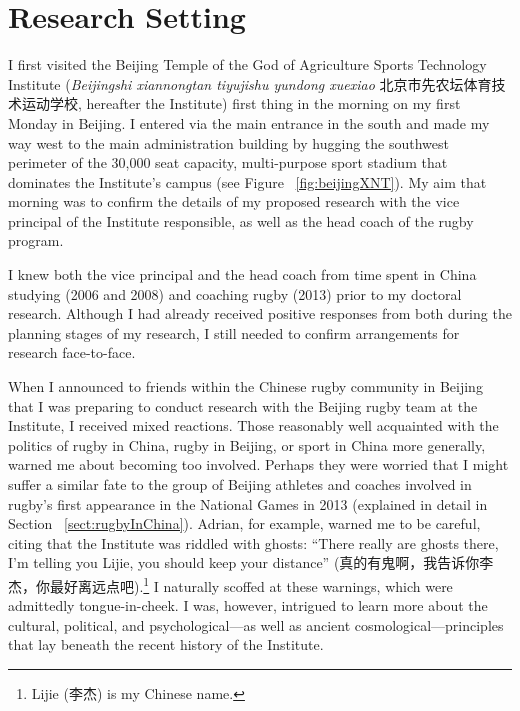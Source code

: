 
\begin{savequote}[8cm]

  \qauthor{}
\end{savequote}


\chapter{\label{chap:researchSetting}Research Setting}


\minitoc




                                          \begin{CJK}{UTF8}{gbsn}


I first visited the Beijing Temple of the God of Agriculture Sports Technology Institute (\textit{Beijingshi xiannongtan tiyujishu yundong xuexiao} 北京市先农坛体育技术运动学校,
hereafter the Institute) first thing in the morning on my first Monday in Beijing.  I entered via the main entrance in the south and made my way west to the main administration building by hugging the southwest perimeter of the 30,000 seat capacity, multi-purpose sport stadium that dominates the Institute's campus (see Figure ~\ref{fig:beijingXNT}). My aim that morning was to confirm the details of my proposed research with the vice principal of the Institute responsible, as well as the head coach of the rugby program.

I knew both the vice principal and the head coach from time spent in China studying (2006 and 2008) and coaching rugby (2013) prior to my doctoral research.  Although I had already received positive responses from both during the planning stages of my research, I still needed to confirm arrangements for research face-to-face.

When I announced to friends within the Chinese rugby community in Beijing that I was preparing to conduct research with the Beijing rugby team at the Institute, I received mixed reactions.  Those reasonably well acquainted with the politics of rugby in China, rugby in Beijing, or sport in China more generally, warned me about becoming too involved.  Perhaps they were worried that I might suffer a similar fate to the group of Beijing athletes and coaches involved in rugby's first appearance in the National Games in 2013 (explained in detail in Section ~\ref{sect:rugbyInChina}).  Adrian, for example, warned me to be careful, citing that the Institute was riddled with ghosts: ``There really are ghosts there, I'm telling you Lijie, you should keep your distance'' (真的有鬼啊，我告诉你李杰，你最好离远点吧).\footnote{Lijie (李杰) is my Chinese name.}  I naturally scoffed at these warnings, which were admittedly tongue-in-cheek.  I was, however, intrigued to learn more about the cultural, political, and psychological---as well as ancient cosmological---principles that lay beneath the recent history of the Institute.


\end{CJK}
